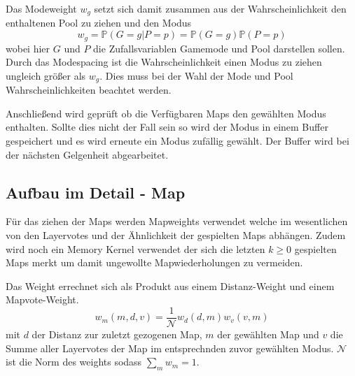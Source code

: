        Das Modeweight $w_g$ setzt sich damit zusammen aus der Wahrscheinlichkeit den enthaltenen Pool zu ziehen und den Modus 
        \begin{equation}
            w_g = \mathbb{P}(G=g|P=p) = \mathbb{P}(G=g)\mathbb{P}(P=p)
        \end{equation}
        wobei hier $G$ und $P$ die Zufallsvariablen \glqq{}Gamemode\grqq{} und \glqq{}Pool\grqq{} darstellen sollen.
        Durch das Modespacing ist die Wahrscheinlichkeit einen Modus zu ziehen ungleich größer als $w_g$. 
        Dies muss bei der Wahl der Mode und Pool Wahrscheinlichkeiten beachtet werden.

        Anschließend wird geprüft ob die Verfügbaren Maps den gewählten Modus enthalten. Sollte dies nicht der Fall sein so wird der Modus in einem Buffer gespeichert und es wird erneute ein Modus zufällig gewählt. 
        Der Buffer wird bei der nächsten Gelgenheit abgearbeitet.
    \subsection{Aufbau im Detail - Map}
    \label{sub:AufbauImDetail-Map}
        Für das ziehen der Maps werden Mapweights verwendet welche im wesentlichen von den Layervotes und der \glqq{}Ähnlichkeit\grqq{} der gespielten Maps abhängen.
        Zudem wird noch ein Memory Kernel verwendet der sich die letzten $k\geq 0$ gespielten Maps merkt um damit ungewollte Mapwiederholungen zu vermeiden.

        Das Weight errechnet sich als Produkt aus einem \glqq{}Distanz-Weight\grqq{} und einem \glqq{}Mapvote-Weight\grqq{}. 
        \begin{equation}
            w_m(m,d,v) = \frac{1}{\mathcal{N}}w_d(d,m)w_v(v,m)
        \end{equation}
        mit $d$ der Distanz zur zuletzt gezogenen Map, $m$ der gewählten Map und $v$ die Summe aller Layervotes der Map im entsprechnden zuvor gewählten Modus.
        $\mathcal{N}$ ist die Norm des weights sodass $\sum_m w_m = 1$.
